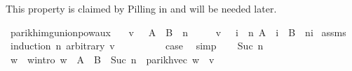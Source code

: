 \begin{isabellebody}
\endisatagproof
{\isafoldproof}%
%
\isadelimproof
%
\endisadelimproof
%
\isadelimdocument
%
\endisadelimdocument
%
\isatagdocument
%
\isamarkuptrue%
%
\endisatagdocument
{\isafolddocument}%
%
\isadelimdocument
%
\endisadelimdocument
%
\begin{isamarkuptext}%
This property is claimed by Pilling in \cite{Pilling} and will be needed later.%
\end{isamarkuptext}\isamarkuptrue%
\isamarkupfalse%
\ parikh{\isacharunderscore}{\kern0pt}img{\isacharunderscore}{\kern0pt}union{\isacharunderscore}{\kern0pt}pow{\isacharunderscore}{\kern0pt}aux{}{\isacharcolon}{\kern0pt}\isanewline
\ \ \ {\isachardoublequoteopen}v\ {\isasymin}\ {\isasymPsi}\ {\isacharparenleft}{\kern0pt}{\isacharparenleft}{\kern0pt}A\ {\isasymunion}\ B{\isacharparenright}{\kern0pt}\ {\isacharcircum}{\kern0pt}{\isacharcircum}{\kern0pt}\ n{\isacharparenright}{\kern0pt}{\isachardoublequoteclose}\isanewline
\ \ \ \ \ {\isachardoublequoteopen}v\ {\isasymin}\ {\isasymPsi}\ {\isacharparenleft}{\kern0pt}{\isasymUnion}i\ {\isasymle}\ n{\isachardot}{\kern0pt}\ A\ {\isacharcircum}{\kern0pt}{\isacharcircum}{\kern0pt}\ i\ {\isacharat}{\kern0pt}{\isacharat}{\kern0pt}\ B\ {\isacharcircum}{\kern0pt}{\isacharcircum}{\kern0pt}\ {\isacharparenleft}{\kern0pt}n{\isacharminus}{\kern0pt}i{\isacharparenright}{\kern0pt}{\isacharparenright}{\kern0pt}{\isachardoublequoteclose}\isanewline
%
\isadelimproof
%
\endisadelimproof
%
\isatagproof
{}\isamarkupfalse%
\ assms\ \isamarkupfalse%
\ {\isacharparenleft}{\kern0pt}induction\ n\ arbitrary{\isacharcolon}{\kern0pt}\ v{\isacharparenright}{\kern0pt}\isanewline
\ \ \isamarkupfalse%
\ {}\isanewline
\ \ \isamarkupfalse%
\ \isamarkupfalse%
\ {\isacharquery}{\kern0pt}case\ \isamarkupfalse%
\ simp\isanewline
{}\isamarkupfalse%
\isanewline
\ \ \isamarkupfalse%
\ {\isacharparenleft}{\kern0pt}Suc\ n{\isacharparenright}{\kern0pt}\isanewline
\ \ \isamarkupfalse%
\ \isamarkupfalse%
\ w\ \ w{\isacharunderscore}{\kern0pt}intro{\isacharcolon}{\kern0pt}\ {\isachardoublequoteopen}w\ {\isasymin}\ {\isacharparenleft}{\kern0pt}A\ {\isasymunion}\ B{\isacharparenright}{\kern0pt}\ {\isacharcircum}{\kern0pt}{\isacharcircum}{\kern0pt}\ {\isacharparenleft}{\kern0pt}Suc\ n{\isacharparenright}{\kern0pt}\ {\isasymand}\ parikh{\isacharunderscore}{\kern0pt}vec\ w\ {\isacharequal}{\kern0pt}\ v{\isachardoublequoteclose}\isanewline

\end{isabellebody}
